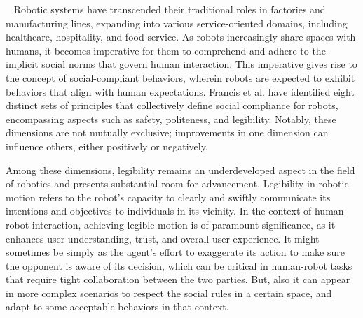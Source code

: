 ~
%
%
%
Robotic systems have transcended their traditional roles in factories and manufacturing lines, expanding into various service-oriented domains, including healthcare, hospitality, and food service.
As robots increasingly share spaces with humans, it becomes imperative for them to comprehend and adhere to the implicit social norms that govern human interaction.
This imperative gives rise to the concept of social-compliant behaviors, wherein robots are expected to exhibit behaviors that align with human expectations.
Francis et al. \cite{francis2023principles} have identified eight distinct sets of principles that collectively define social compliance for robots, encompassing aspects such as safety, politeness, and legibility.
Notably, these dimensions are not mutually exclusive; improvements in one dimension can influence others, either positively or negatively.

Among these dimensions, legibility remains an underdeveloped aspect in the field of robotics and presents substantial room for advancement.
Legibility in robotic motion refers to the robot's capacity to clearly and swiftly communicate its intentions and objectives to individuals in its vicinity.
In the context of human-robot interaction, achieving legible motion is of paramount significance, as it enhances user understanding, trust, and overall user experience.
%
It might sometimes be simply as the agent's effort to exaggerate its action to make sure the opponent is aware of its decision, which can be critical in human-robot tasks that require tight collaboration between the two parties.
But, also it can appear in more complex scenarios to respect the social rules in a certain space, and adapt to some acceptable behaviors in that context.

